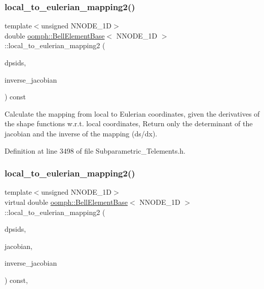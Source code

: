 \subsubsection{\texorpdfstring{local\+\_\+to\+\_\+eulerian\+\_\+mapping2()}{local\_to\_eulerian\_mapping2()}\hspace{0.1cm}{\footnotesize\ttfamily [1/2]}}
{\footnotesize\ttfamily template$<$unsigned N\+N\+O\+D\+E\+\_\+1D$>$ \\
double \hyperlink{classoomph_1_1BellElementBase}{oomph\+::\+Bell\+Element\+Base}$<$ N\+N\+O\+D\+E\+\_\+1D $>$\+::local\+\_\+to\+\_\+eulerian\+\_\+mapping2 (\begin{DoxyParamCaption}\item[{const \hyperlink{classoomph_1_1DShape}{D\+Shape} \&}]{dpsids,  }\item[{\hyperlink{classoomph_1_1DenseMatrix}{Dense\+Matrix}$<$ double $>$ \&}]{inverse\+\_\+jacobian }\end{DoxyParamCaption}) const\hspace{0.3cm}{\ttfamily [inline]}}



Calculate the mapping from local to Eulerian coordinates, given the derivatives of the shape functions w.\+r.\+t. local coordinates, Return only the determinant of the jacobian and the inverse of the mapping (ds/dx). 



Definition at line 3498 of file Subparametric\+\_\+\+Telements.\+h.

\mbox{\label{classoomph_1_1BellElementBase_a20792e4f9ae0fcfadc406c4fca5ca0f6}} 
\subsubsection{\texorpdfstring{local\+\_\+to\+\_\+eulerian\+\_\+mapping2()}{local\_to\_eulerian\_mapping2()}\hspace{0.1cm}{\footnotesize\ttfamily [2/2]}}
{\footnotesize\ttfamily template$<$unsigned N\+N\+O\+D\+E\+\_\+1D$>$ \\
virtual double \hyperlink{classoomph_1_1BellElementBase}{oomph\+::\+Bell\+Element\+Base}$<$ N\+N\+O\+D\+E\+\_\+1D $>$\+::local\+\_\+to\+\_\+eulerian\+\_\+mapping2 (\begin{DoxyParamCaption}\item[{const \hyperlink{classoomph_1_1DShape}{D\+Shape} \&}]{dpsids,  }\item[{\hyperlink{classoomph_1_1DenseMatrix}{Dense\+Matrix}$<$ double $>$ \&}]{jacobian,  }\item[{\hyperlink{classoomph_1_1DenseMatrix}{Dense\+Matrix}$<$ double $>$ \&}]{inverse\+\_\+jacobian }\end{DoxyParamCaption}) const\hspace{0.3cm}{\ttfamily [inline]}, {\ttfamily [virtual]}}



